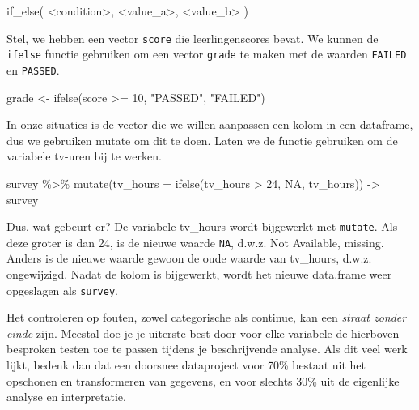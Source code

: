 \documentclass[]{tufte-book}
\newenvironment{Shaded}{}{}
\newcommand{\AttributeTok}[1]{\textcolor[rgb]{0.49,0.56,0.16}{#1}}
\newcommand{\ConstantTok}[1]{\textcolor[rgb]{0.53,0.00,0.00}{#1}}
\newcommand{\DecValTok}[1]{\textcolor[rgb]{0.25,0.63,0.44}{#1}}
\newcommand{\FunctionTok}[1]{\textcolor[rgb]{0.02,0.16,0.49}{#1}}
\newcommand{\NormalTok}[1]{#1}
\newcommand{\OtherTok}[1]{\textcolor[rgb]{0.00,0.44,0.13}{#1}}
\newcommand{\SpecialCharTok}[1]{\textcolor[rgb]{0.25,0.44,0.63}{#1}}
\newcommand{\StringTok}[1]{\textcolor[rgb]{0.25,0.44,0.63}{#1}}
\begin{document}
\begin{Shaded}
\begin{Highlighting}[]
\FunctionTok{if\_else}\NormalTok{( }\SpecialCharTok{\textless{}}\NormalTok{condition}\SpecialCharTok{\textgreater{}}\NormalTok{, }\SpecialCharTok{\textless{}}\NormalTok{value\_a}\SpecialCharTok{\textgreater{}}\NormalTok{, }\SpecialCharTok{\textless{}}\NormalTok{value\_b}\SpecialCharTok{\textgreater{}}\NormalTok{ )}
\end{Highlighting}
\end{Shaded}

Stel, we hebben een vector \texttt{score} die leerlingenscores bevat. We kunnen de \texttt{ifelse} functie gebruiken om een vector \texttt{grade} te maken met de waarden \texttt{FAILED} en \texttt{PASSED}.

\begin{Shaded}
\begin{Highlighting}[]
\NormalTok{grade }\OtherTok{\textless{}{-}} \FunctionTok{ifelse}\NormalTok{(score }\SpecialCharTok{\textgreater{}=} \DecValTok{10}\NormalTok{, }\StringTok{"PASSED"}\NormalTok{, }\StringTok{"FAILED"}\NormalTok{)}
\end{Highlighting}
\end{Shaded}

In onze situaties is de vector die we willen aanpassen een kolom in een dataframe, dus we gebruiken mutate om dit te doen. Laten we de functie gebruiken om de variabele tv-uren bij te werken.

\begin{Shaded}
\begin{Highlighting}[]
\NormalTok{survey }\SpecialCharTok{\%\textgreater{}\%}
  \FunctionTok{mutate}\NormalTok{(}\AttributeTok{tv\_hours =} \FunctionTok{ifelse}\NormalTok{(tv\_hours }\SpecialCharTok{\textgreater{}} \DecValTok{24}\NormalTok{, }\ConstantTok{NA}\NormalTok{, tv\_hours)) }\OtherTok{{-}\textgreater{}}\NormalTok{ survey}
\end{Highlighting}
\end{Shaded}

Dus, wat gebeurt er? De variabele tv\_hours wordt bijgewerkt met \texttt{mutate}. Als deze groter is dan 24, is de nieuwe waarde \texttt{NA}, d.w.z. Not Available, missing. Anders is de nieuwe waarde gewoon de oude waarde van tv\_hours, d.w.z. ongewijzigd. Nadat de kolom is bijgewerkt, wordt het nieuwe data.frame weer opgeslagen als \texttt{survey}.

Het controleren op fouten, zowel categorische als continue, kan een \emph{straat zonder einde} zijn. Meestal doe je je uiterste best door voor elke variabele de hierboven besproken testen toe te passen tijdens je beschrijvende analyse. Als dit veel werk lijkt, bedenk dan dat een doorsnee dataproject voor 70\% bestaat uit het opschonen en transformeren van gegevens, en voor slechts 30\% uit de eigenlijke analyse en interpretatie.
\end{document}
